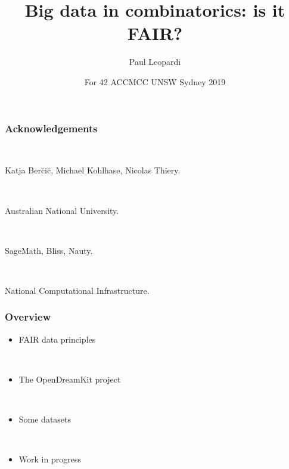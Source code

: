 \documentclass[pdf,sprung,slideColor,nocolorBG]{beamer}
\title{Big data in combinatorics: is it FAIR?}
\author{Paul Leopardi}
\date{For 42 ACCMCC UNSW Sydney 2019}
\institute{Australian National University.}
\begin{document}
\frame{\titlepage}
\begin{frame}
\frametitle{Acknowledgements}
\begin{center}
~
 
Katja Ber\u{c}i\u{c}, Michael Kohlhase, Nicolas Thiery.
 
~

Australian National University.

~

SageMath, Bliss, Nauty.

~

National Computational Infrastructure.
\end{center}
\end{frame}

\begin{frame}
\frametitle{Overview}
\begin{itemize}
\item
FAIR data principles

~

\item
The OpenDreamKit project

~

\item
Some datasets

~

\item
Work in progress

\end{itemize}
 
\end{frame}
\end{document}
